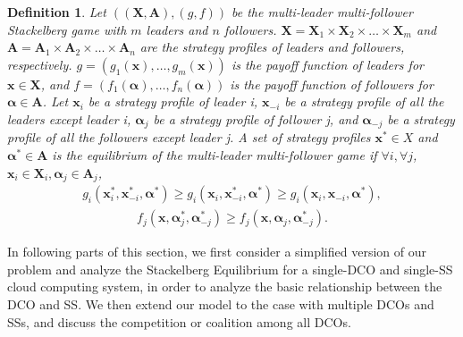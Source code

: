 \documentclass[twocolumn,10pt]{IEEEtran}
\newtheorem{definition}{Definition}
\begin{document}
\begin{definition}\cite{hzhang12}
Let $\left( {(\mathbf{X},\mathbf{A}),(g,f)} \right)$ be the multi-leader multi-follower Stackelberg game with $m$ leaders and $n$ followers.
$\mathbf{X}=\mathbf{X}_1\times\mathbf{X}_2\times \dotsc \times \mathbf{X}_m$ and $\mathbf{A}=\mathbf{A}_1\times\mathbf{A}_2\times \dotsc \times \mathbf{A}_n$ are the strategy profiles of leaders and followers, respectively.
$g =(g_1(\mathbf{x}), \dotsc, g_m(\mathbf{x}))$ is the payoff function of leaders for $\mathbf{x}\in \mathbf{X}$, and
$f =(f_1(\boldsymbol\alpha), \dotsc, f_n(\boldsymbol\alpha))$ is the payoff function of followers for $\boldsymbol\alpha\in \mathbf{A}$.
Let $\mathbf{x}_i$ be a strategy profile of leader i, $\mathbf{x}_{-i}$ be a strategy profile of all the leaders except leader i,
$\boldsymbol\alpha_j$ be a strategy profile of follower j, and $\boldsymbol\alpha_{-j}$ be a strategy profile of all the followers except leader j.
A set of strategy profiles $\mathbf{x}^* \in X$ and $\boldsymbol\alpha^* \in \mathbf{A}$ is the equilibrium of the multi-leader multi-follower game if $\forall i,\forall j$, $\mathbf{x}_i\in \mathbf{X}_i ,\boldsymbol\alpha_j\in \mathbf{A}_j $,
\begin{equation}\nonumber
    \begin{array}{l}
         g_i(\mathbf{x}^*_{i}, \mathbf{x}^*_{-i}, \boldsymbol\alpha^*) \geq g_i(\mathbf{x}_{i},\mathbf{x}^*_{-i}, \boldsymbol\alpha^*) \geq g_i(\mathbf{x}_{i},\mathbf{x}_{-i}, \boldsymbol\alpha^*),
    \end{array}
\end{equation}
\begin{equation}\nonumber
    \begin{array}{l}
       f_j(\mathbf{x}, \boldsymbol\alpha^*_{j}, \boldsymbol\alpha^*_{-j}) \geq f_j(\mathbf{x}, \boldsymbol\alpha_{j}, \boldsymbol\alpha^*_{-j}).
    \end{array}
\end{equation}



\end{definition}


In following parts of this section, we first consider a simplified version of our problem and analyze the Stackelberg Equilibrium for a single-DCO and single-SS cloud computing system, in order to analyze the basic relationship between the DCO and SS. We then extend our model to the case with multiple DCOs and SSs, and discuss the competition or coalition among all DCOs.
\end{document}
